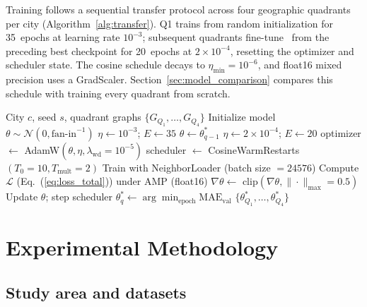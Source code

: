 \documentclass{ieeeaccess}
\begin{document}
Training follows a sequential transfer protocol across four geographic quadrants per city (Algorithm~\ref{alg:transfer}). Q1 trains from random initialization for 35~epochs at learning rate $10^{-3}$; subsequent quadrants fine-tune~\cite{jaiswal2026data} from the preceding best checkpoint for 20~epochs at $2 \times 10^{-4}$, resetting the optimizer and scheduler state. The cosine schedule decays to $\eta_{\min}{=}10^{-6}$, and float16 mixed precision uses a GradScaler. Section~\ref{sec:model_comparison} compares this schedule with training every quadrant from scratch.

\begin{algorithm}[!t]
\caption{Sequential Transfer Learning Protocol}
\label{alg:transfer}
\begin{algorithmic}[1]
\REQUIRE City $c$, seed $s$, quadrant graphs $\{G_{Q_1}, \ldots, G_{Q_4}\}$
\STATE Initialize model $\theta \sim \mathcal{N}(0, \text{fan-in}^{-1})$
        \STATE $\eta \gets 10^{-3}$; $E \gets 35$
    \ELSE
        \STATE $\theta \gets \theta^*_{q-1}$ 
        \STATE $\eta \gets 2 \times 10^{-4}$; $E \gets 20$
    \ENDIF
    \STATE optimizer $\gets$ AdamW$(\theta, \eta, \lambda_{\text{wd}}{=}10^{-5})$
    \STATE scheduler $\gets$ CosineWarmRestarts$(T_0{=}10, T_{\text{mult}}{=}2)$
        \STATE Train with NeighborLoader (batch size $= \num{24576}$)
        \STATE Compute $\mathcal{L}$ (Eq.~(\ref{eq:loss_total})) under AMP (float16)
        \STATE $\nabla\theta \gets$ clip$(\nabla\theta, \|\cdot\|_{\max}{=}0.5)$
        \STATE Update $\theta$; step scheduler
    \ENDFOR
    \STATE $\theta^*_q \gets \arg\min_{\text{epoch}} \text{MAE}_{\text{val}}$
\ENDFOR
\RETURN $\{\theta^*_{Q_1}, \ldots, \theta^*_{Q_4}\}$
\end{algorithmic}
\end{algorithm}


\section{Experimental Methodology}
\label{sec:methodology}

\subsection{Study area and datasets}
\end{document}
